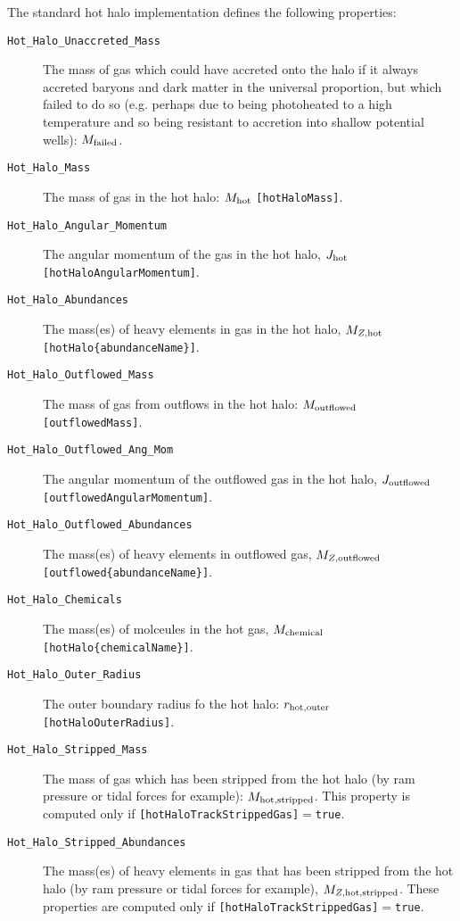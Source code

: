 The standard hot halo implementation defines the following properties:
\begin{description}
 \item [{\tt Hot\_Halo\_Unaccreted\_Mass}] The mass of gas which could have accreted onto the halo if it always accreted baryons and dark matter in the universal proportion, but which failed to do so (e.g. perhaps due to being photoheated to a high temperature and so being resistant to accretion into shallow potential wells): $M_{\rm failed}$.
 \item [{\tt Hot\_Halo\_Mass}] The mass of gas in the hot halo: $M_{\rm hot}$ {\tt [hotHaloMass]}.
 \item [{\tt Hot\_Halo\_Angular\_Momentum}] The angular momentum of the gas in the hot halo, $J_{\rm hot}$ {\tt [hotHaloAngularMomentum]}.
 \item [{\tt Hot\_Halo\_Abundances}] The mass(es) of heavy elements in gas in the hot halo, $M_{Z, {\rm hot}}$ {\tt [hotHalo\{abundanceName\}]}.
 \item [{\tt Hot\_Halo\_Outflowed\_Mass}] The mass of gas from outflows in the hot halo: $M_{\rm outflowed}$ {\tt [outflowedMass]}.
 \item [{\tt Hot\_Halo\_Outflowed\_Ang\_Mom}] The angular momentum of the outflowed gas in the hot halo, $J_{\rm outflowed}$ {\tt [outflowedAngularMomentum]}.
 \item [{\tt Hot\_Halo\_Outflowed\_Abundances}] The mass(es) of heavy elements in outflowed gas, $M_{Z, {\rm outflowed}}$ {\tt [outflowed\{abundanceName\}]}.
 \item [{\tt Hot\_Halo\_Chemicals}] The mass(es) of molceules in the hot gas, $M_{\rm chemical}$ {\tt [hotHalo\{chemicalName\}]}.
 \item [{\tt Hot\_Halo\_Outer\_Radius}] The outer boundary radius fo the hot halo: $r_{\rm hot, outer}$ {\tt [hotHaloOuterRadius]}.
 \item [{\tt Hot\_Halo\_Stripped\_Mass}] The mass of gas which has been stripped from the hot halo (by ram pressure or tidal forces for example): $M_{\rm hot, stripped}$. This property is computed only if {\tt [hotHaloTrackStrippedGas]}$=${\tt true}.
 \item [{\tt Hot\_Halo\_Stripped\_Abundances}] The mass(es) of heavy elements in gas that has been stripped from the hot halo (by ram pressure or tidal forces for example), $M_{Z, {\rm hot, stripped}}$. These properties are computed only if {\tt [hotHaloTrackStrippedGas]}$=${\tt true}.
\end{description}
